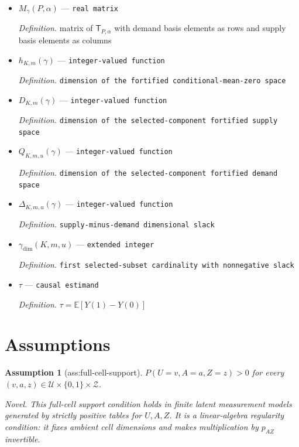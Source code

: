 \documentclass{article}
\newtheorem{assumption}{Assumption}
\begin{document}
\begin{itemize}
  \par\smallskip\noindent\emph{Definition.} \texttt{pairing map from demand functions to linear functionals on the supply space}
  \item \(M_\gamma(P,\alpha)\) --- \texttt{real matrix}
  \par\smallskip\noindent\emph{Definition.} matrix of \(\mathsf T_{P,\alpha}\) with demand basis elements as rows and supply basis elements as columns
  \item \(h_{K,m}(\gamma)\) --- \texttt{integer-\allowbreak{}valued function}
  \par\smallskip\noindent\emph{Definition.} \texttt{dimension of the fortified conditional-\allowbreak{}mean-\allowbreak{}zero space}
  \item \(D_{K,m}(\gamma)\) --- \texttt{integer-\allowbreak{}valued function}
  \par\smallskip\noindent\emph{Definition.} \texttt{dimension of the selected-\allowbreak{}component fortified supply space}
  \item \(Q_{K,m,u}(\gamma)\) --- \texttt{integer-\allowbreak{}valued function}
  \par\smallskip\noindent\emph{Definition.} \texttt{dimension of the selected-\allowbreak{}component fortified demand space}
  \item \(\Delta_{K,m,u}(\gamma)\) --- \texttt{integer-\allowbreak{}valued function}
  \par\smallskip\noindent\emph{Definition.} \texttt{supply-\allowbreak{}minus-\allowbreak{}demand dimensional slack}
  \item \(\gamma_{\mathrm{dim}}(K,m,u)\) --- \texttt{extended integer}
  \par\smallskip\noindent\emph{Definition.} \texttt{first selected-\allowbreak{}subset cardinality with nonnegative slack}
  \item \(\tau\) --- \texttt{causal estimand}
  \par\smallskip\noindent\emph{Definition.} \(\tau=\mathbb E[Y(1)-Y(0)]\)
\end{itemize}

\section{Assumptions}

\begin{assumption}[ass:full-cell-support]\label{ass:full-cell-support}
\(P(U=v,A=a,Z=z)>0\) for every \((v,a,z)\in\mathcal U\times\{0,1\}\times\mathcal Z\).
\par\smallskip\noindent\emph{Novel.} This full-cell support condition holds in finite latent measurement models generated by strictly positive tables for \(U,A,Z\). It is a linear-algebra regularity condition: it fixes ambient cell dimensions and makes multiplication by \(p_{AZ}\) invertible.
\end{assumption}
\end{document}
